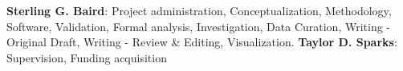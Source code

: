 \textbf{Sterling G. Baird}: Project administration, Conceptualization, Methodology, Software, Validation, Formal analysis, Investigation, Data Curation, Writing - Original Draft, Writing - Review \& Editing, Visualization. \textbf{Taylor D. Sparks}: Supervision, Funding acquisition
